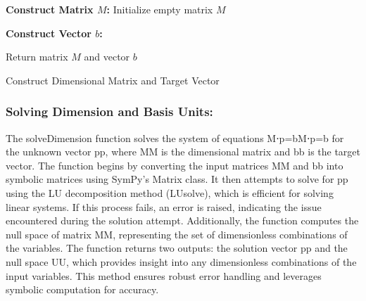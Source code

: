 \documentclass{article}
\begin{document}
\begin{algorithm}[H]
\SetAlgoLined
{}

\textbf{Construct Matrix \(M\):}\;
Initialize empty matrix \(M\)\;

\textbf{Construct Vector \(b\):}\;

Return matrix \(M\) and vector \(b\)\;

\caption{Construct Dimensional Matrix and Target Vector}
\label{alg:get_matrix_target} %
\end{algorithm}






\subsubsection{Solving Dimension and Basis Units:}


The solveDimension function solves the system of equations M⋅p=bM⋅p=b for the unknown vector pp, where MM is the dimensional matrix and bb is the target vector. The function begins by converting the input matrices MM and bb into symbolic matrices using SymPy's Matrix class. It then attempts to solve for pp using the LU decomposition method (LUsolve), which is efficient for solving linear systems. If this process fails, an error is raised, indicating the issue encountered during the solution attempt. Additionally, the function computes the null space of matrix MM, representing the set of dimensionless combinations of the variables. The function returns two outputs: the solution vector pp and the null space UU, which provides insight into any dimensionless combinations of the input variables. This method ensures robust error handling and leverages symbolic computation for accuracy.\\
\end{document}
